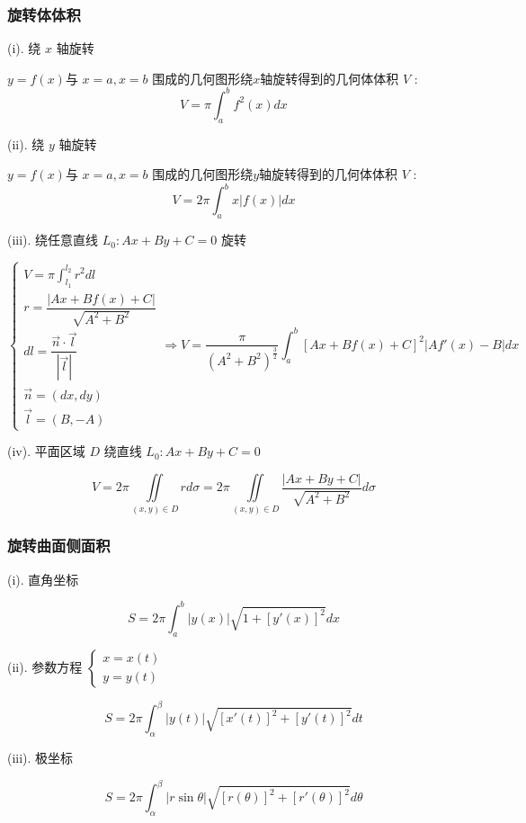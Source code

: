 \subsubsection{旋转体体积}
\begin{theorem}[旋转体体积]

	(i). 绕 $x$ 轴旋转

	$y=f(x)$与 $x=a,x=b$ 围成的几何图形绕$x$轴旋转得到的几何体体积 $V$ :
	$$V=\pi\int_{a}^{b}f^{2}(x)dx$$

	(ii). 绕 $y$ 轴旋转

	$y=f(x)$与 $x=a,x=b$ 围成的几何图形绕$y$轴旋转得到的几何体体积 $V$ :
	$$V=2\pi\int_{a}^{b}x|f(x)|dx$$

	(iii). 绕任意直线 $L_{0}: Ax+By+C=0$ 旋转

	$$\begin{cases} V=\pi\int_{l_{1}}^{l_{2}}r^{2}dl \\ 
		r = \dfrac{|Ax+Bf(x)+C|}{\sqrt{A^{2}+B^{2}}}\\
		dl = \dfrac{\vec{n}\cdot \vec{l}}{|\vec{l}|}\\
		\vec{n} = (dx,dy)\\
		\vec{l} = (B,-A)
	\end{cases}\Rightarrow V = \dfrac{\pi}{(A^{2}+B^{2})^{\frac{3}{2}}}\int_{a}^{b} \left[Ax+Bf(x)+C\right]^{2}\big|Af'(x)-B\big|dx$$

	(iv). 平面区域 $D$ 绕直线 $L_{0}: Ax+By+C=0$

	$$V = 2\pi\iint\limits_{(x,y)\in D} rd\sigma = 2\pi\iint\limits_{(x,y)\in D} \dfrac{|Ax+By+C|}{\sqrt{A^{2}+B^{2}}}d\sigma$$
\end{theorem}
\subsubsection{旋转曲面侧面积}
\begin{theorem}

	(i). 直角坐标

	$$S = 2\pi\int_{a}^{b}|y(x)|\sqrt{1+[y'(x)]^{2}}dx$$

	(ii). 参数方程 $\begin{cases}
		x=x(t) \\
		y=y(t)
	\end{cases}$

	$$S = 2\pi\int_{\alpha}^{\beta}|y(t)|\sqrt{[x'(t)]^{2}+[y'(t)]^{2}}dt$$

	(iii). 极坐标

	$$S = 2\pi \int_{\alpha}^{\beta}|r\sin\theta|\sqrt{[r(\theta)]^{2}+[r'(\theta)]^{2}}d\theta$$
\end{theorem}
